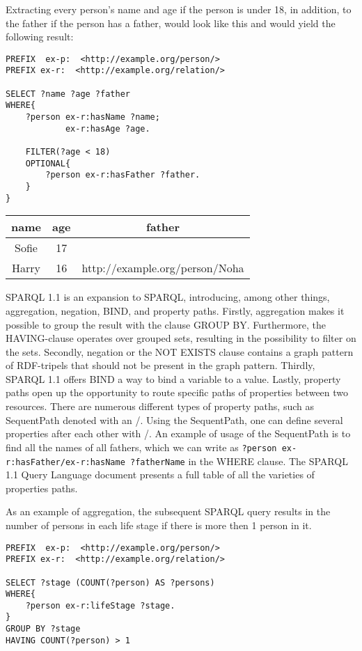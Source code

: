 \para
Extracting every person's name and age if the person is under 18, in addition, to the father if the person has a father, would look like this and would yield   the following result:

\para
\begin{lstlisting}[frame=single, language=turtle, frame=none]
PREFIX  ex-p:  <http://example.org/person/> 
PREFIX ex-r:  <http://example.org/relation/> 

SELECT ?name ?age ?father
WHERE{
    ?person ex-r:hasName ?name;
            ex-r:hasAge ?age.

    FILTER(?age < 18)
    OPTIONAL{
        ?person ex-r:hasFather ?father.
    }
}
\end{lstlisting}

\para
\begin{tabular}{@{}ccc@{}}
    \toprule
    name & age & father \\ \midrule
    Sofie & 17 & \\ 
    Harry & 16 & http://example.org/person/Noha\\ \bottomrule
\end{tabular}


\para
SPARQL 1.1\cite{SPARQL1.1} is an expansion to SPARQL, introducing, among other things, aggregation, negation, BIND, and property paths. Firstly, aggregation makes it possible to group the result with the clause GROUP BY. Furthermore, the HAVING-clause operates over grouped sets, resulting in the possibility to filter on the sets. Secondly, negation or the NOT EXISTS clause contains a graph pattern of RDF-tripels that should not be present in the graph pattern. Thirdly, SPARQL 1.1 offers BIND a way to bind a variable to a value. Lastly, property paths open up the opportunity to route specific paths of properties between two resources. There are numerous different types of property paths, such as SequentPath denoted with an /. Using the SequentPath, one can define several properties after each other with /. An example of usage of the SequentPath is to find all the names of all fathers, which we can write as \lstinline{?person ex-r:hasFather/ex-r:hasName ?fatherName} in the WHERE clause. The SPARQL 1.1 Query Language document presents a full table of all the varieties of properties paths.

\para
As an example of aggregation, the subsequent SPARQL query results in the number of persons in each life stage if there is more then 1 person in it. 

\begin{lstlisting}[frame=single, language=turtle, frame=none]
PREFIX  ex-p:  <http://example.org/person/> 
PREFIX ex-r:  <http://example.org/relation/> 

SELECT ?stage (COUNT(?person) AS ?persons)
WHERE{
    ?person ex-r:lifeStage ?stage.
}
GROUP BY ?stage
HAVING COUNT(?person) > 1
\end{lstlisting}
    
